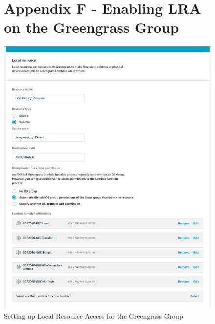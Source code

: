     
\begin{figure}
\begin{minipage}{\linewidth}
\section{Appendix F - Enabling LRA on the Greengrass Group}
    \centering
    \includegraphics[width=1\linewidth]{pages/Chapter4/Chapter 4 Images/greengrass_LRA.png}
    \caption{Setting up Local Resource Access for the Greengrass Group}
    \label{appendix:ggc_lra}
\end{minipage}
\end{figure}
    